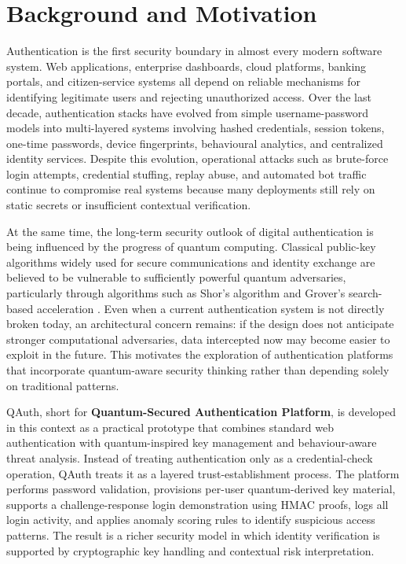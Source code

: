 \documentclass[12pt,a4paper]{report}
\begin{document}
\section{Background and Motivation}
Authentication is the first security boundary in almost every modern software system. Web applications, enterprise dashboards, cloud platforms, banking portals, and citizen-service systems all depend on reliable mechanisms for identifying legitimate users and rejecting unauthorized access. Over the last decade, authentication stacks have evolved from simple username-password models into multi-layered systems involving hashed credentials, session tokens, one-time passwords, device fingerprints, behavioural analytics, and centralized identity services. Despite this evolution, operational attacks such as brute-force login attempts, credential stuffing, replay abuse, and automated bot traffic continue to compromise real systems because many deployments still rely on static secrets or insufficient contextual verification.

At the same time, the long-term security outlook of digital authentication is being influenced by the progress of quantum computing. Classical public-key algorithms widely used for secure communications and identity exchange are believed to be vulnerable to sufficiently powerful quantum adversaries, particularly through algorithms such as Shor's algorithm and Grover's search-based acceleration \cite{shor1994,grover1996}. Even when a current authentication system is not directly broken today, an architectural concern remains: if the design does not anticipate stronger computational adversaries, data intercepted now may become easier to exploit in the future. This motivates the exploration of authentication platforms that incorporate quantum-aware security thinking rather than depending solely on traditional patterns.

QAuth, short for \textbf{Quantum-Secured Authentication Platform}, is developed in this context as a practical prototype that combines standard web authentication with quantum-inspired key management and behaviour-aware threat analysis. Instead of treating authentication only as a credential-check operation, QAuth treats it as a layered trust-establishment process. The platform performs password validation, provisions per-user quantum-derived key material, supports a challenge-response login demonstration using HMAC proofs, logs all login activity, and applies anomaly scoring rules to identify suspicious access patterns. The result is a richer security model in which identity verification is supported by cryptographic key handling and contextual risk interpretation.
\end{document}
